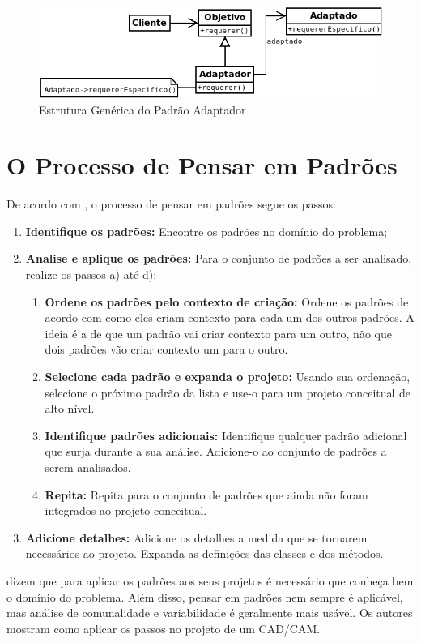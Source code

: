 \begin{figure}[h]
\begin{center}
\includegraphics[scale=0.6]{adaptador.png}
\caption{Estrutura Genérica do Padrão Adaptador}\label{fig:adaptador}
\end{center}
\end{figure}

\section{O Processo de Pensar em Padrões}

De acordo com , o processo de pensar em padrões segue os passos:
\begin{enumerate}
\item \textbf{Identifique os padrões:} Encontre os padrões no domínio do problema;
\item \textbf{Analise e aplique os padrões:} Para o conjunto de padrões a ser analisado, realize os passos a) até d):
\begin{enumerate}
\item \textbf{Ordene os padrões pelo contexto de criação:} Ordene os padrões de acordo com como eles criam contexto para cada um dos outros padrões. A ideia é a de que um padrão vai criar contexto para um outro, não que dois padrões vão criar contexto um para o outro.
\item \textbf{Selecione cada padrão e expanda o projeto:} Usando sua ordenação, selecione o próximo padrão da lista e use-o para um projeto conceitual de alto nível.
\item \textbf{Identifique padrões adicionais:} Identifique qualquer padrão adicional que surja durante a sua análise. Adicione-o ao conjunto de padrões a serem analisados.
\item \textbf{Repita:} Repita para o conjunto de padrões que ainda não foram integrados ao projeto conceitual.
\end{enumerate}
\item \textbf{Adicione detalhes:} Adicione os detalhes a medida que se tornarem necessários ao projeto. Expanda as definições das classes e dos métodos.
\end{enumerate}

\cite{DP:explained} dizem que para aplicar os padrões aos seus projetos é necessário que conheça bem o domínio do problema. Além disso, pensar em padrões nem sempre é aplicável, mas análise de comunalidade e variabilidade é geralmente mais usável. Os autores mostram como aplicar os passos no projeto de um CAD/CAM.
